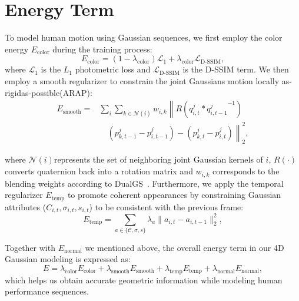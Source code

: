 \section{Energy Term}
To model human motion using Gaussian sequences, we first employ the color energy $E_{\text{color}}$ during the training process:
\begin{equation}
E_{\text{color}} = (1 - \lambda_{\text{color}}) \mathcal{L}_1 + \lambda_{\text{color}} \mathcal{L}_{\text{D-SSIM}},
\end{equation}
where $\mathcal{L}_1$ is the $L_1$ photometric loss and $\mathcal{L}_{\text{D-SSIM}}$ is the D-SSIM term. We then employ a smooth regularizer to constrain the joint Gaussians motion locally as-rigidas-possible(ARAP):
\begin{equation}
\begin{aligned}
    E_{\text{smooth}} =& \sum_{i} \sum_{k \in \mathcal{N}(i)} w_{i,k} \left\| R \left( q_{i,t}^{j} * {q_{i,t-1}^{j}}^{-1} \right) \right. \\
    & \quad \left. \left( p_{k,t-1}^{j} - p_{i,t-1}^{j} \right) - \left( p_{k,t}^{j} - p_{i,t}^{j} \right) \right\|_2^2,
\end{aligned}
\end{equation}

where $\mathcal{N}(i)$represents the set of neighboring joint Gaussian kernels of $i$, $R(\cdot)$ converts quaternion back into a rotation matrix and $w_{i,k}$ corresponds to the blending weights according to DualGS~\cite{jiang2024robust}.
Furthermore, we apply the temporal regularizer $E_{\text{temp}}$ to promote coherent appearances by constraining Gaussian attributes ($C_{i,t}, \sigma_{i,t}, s_{i,t}$) to be consistent with the previous frame:
\begin{equation}
    E_{\text{temp}} = \sum_{a \in \{\mathcal{C}, \sigma, s\}}\lambda_a \| a_{i,t} - a_{i,t-1} \|_2^2,
\end{equation}

Together with $E_{\text{normal}}$ we mentioned above, the overall energy term in our 4D Gaussian modeling is expressed as:
\begin{equation}
    E = \lambda_{\text{color}}E_{\text{color}}+\lambda_{\text{smooth}}E_{\text{smooth}}+\lambda_{\text{temp}}E_{\text{temp}}+\lambda_{\text{normal}}E_{\text{normal}},
\end{equation}
which helps us obtain accurate geometric information while modeling human performance sequences.




